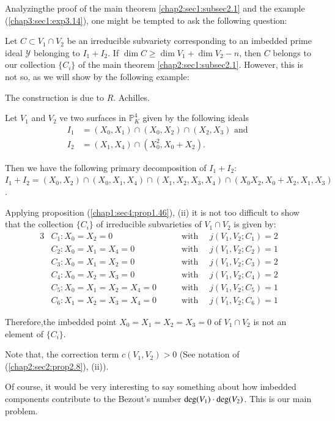 Analyzing\pageoriginale the proof of the main theorem
\ref{chap2:sec1:subsec2.1} and the example (\ref{chap3:sec1:exp3.14}),
one might be tempted to ask the following question: 

Let $C \subset V_1 \cap V_2$ be an irreducible subvariety
corresponding to an imbedded prime ideal $\mathscr {Y}$ belonging to $
I_1 + I_2$. If $\dim C \geq \dim V_1 + \dim V_2 -n $, then $C$ belongs
to our collection $\{ C_i\}$ of the main theorem
\ref{chap2:sec1:subsec2.1}. However, this 
is not so, as we will show by the following example:  

The construction is due to $R$. Achilles.
 
 Let $V_1$ and $V_2$ ve two surfaces in $\mathbb{P}_K^4$ given by the
 following ideals 
 \begin{align*}
   I_1 &=(X_0,X_1) \cap (X_0,X_2) \cap (X_2,X_3) \text{ and }\\ 
   I_2 &=(X_1,X_4) \cap (X_0^2, X_0 +X_2).
 \end{align*} 
 
 Then we have the following primary decomposition of $I_1+I_2:$
 $ I_1+I_2= (X_0,X_2) \cap (X_0,X_1,X_4)\cap (X_1,X_2,X_3,X_4) \cap
 (X_0X_2,X_0+X_2,X_1,X_3)$. 
  
 Applying proposition (\ref{chap1:sec4:prop1.46}), (ii) it is not too
 difficult to show that 
 the collection $\{ C_i\}$ of irreducible subvarieties of $V_1 \cap
 V_2$ is given by: 
\begin{alignat*}{3}
  &C_1 :  X_0 = X_2 = 0  && \text{ with }\quad j(V_1,
  V_2;C_1) =2\\ 
  &C_2 : X_0 = X_1 = X_4 = 0   &&\text{ with }\quad j(V_1, V_2;C_2) =1\\
  &C_3 : X_0 = X_1 = X_2 = 0  &&\text{ with } \quad j(V_1, V_2;C_3) =2\\
  &C_4 : X_0 = X_2 = X_3 = 0  && \text{ with } \quad j(V_1, V_2;C_4) =2\\
  &C_5 : X_0 = X_1 = X_2 = X_4= 0  &&\text{ with }\quad j(V_1,
  V_2;C_5) =1\\ 
  &C_6 : X_1 = X_2 = X_3 =X_4 =0 \quad& & \text{ with }\quad j(V_1,
  V_2;C_6) =1 
\end{alignat*}
  
  Therefore,\pageoriginale the imbedded point $ X_0 = X_1 =X_2 = X_3=0$ of $ V_1
  \cap V_2$ is not an element of $\{C_i\}$. 
  
  Note that, the correction term $c(V_1, V_2)>0 $ (See notation of (\ref{chap2:sec2:prop2.8}), (ii)).
  
  Of course, it would be very interesting to say something about how
  imbedded components contribute to the  Bezout's number $\deg (V_1)
  \cdot \deg\break (V_2)$. This is our main problem.  
 
